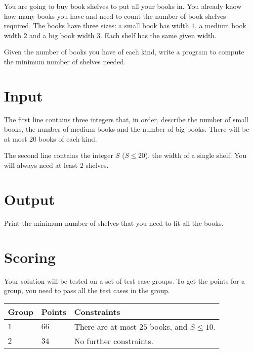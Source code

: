 You are going to buy book shelves to put all your books in.
You already know how many books you have and need to count the number of book shelves required.
The books have three sizes: a small book has width $1$, a medium book width $2$ and a big book width $3$.
Each shelf has the same given width.

Given the number of books you have of each kind, write a program to compute the minimum number of shelves needed.

\section*{Input}
The first line contains three integers that, in order, describe the number of small books, the number of medium books and the number of big books.
There will be at most $20$ books of each kind.

The second line contains the integer $S$ ($S \le 20$), the width of a single shelf.
You will always need at least $2$ shelves.

\section*{Output}
Print the minimum number of shelves that you need to fit all the books.

\section*{Scoring}
Your solution will be tested on a set of test case groups.
To get the points for a group, you need to pass all the test cases in the group.

\noindent
\begin{tabular}{| l | l | p{10cm} |}
\hline
Group & Points & Constraints \\ \hline
  $1$    & $66$        & There are at most $25$ books, and $S \le 10$. \\ \hline 
  $2$    & $34$        & No further constraints. \\ \hline 
\end{tabular}

